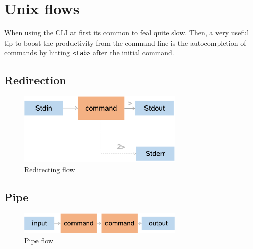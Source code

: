 \documentclass[
  letterpaper,
  DIV=11,
  numbers=noendperiod,
  oneside]{scrreprt}
\begin{document}
\hypertarget{unix-flows}{%
\section{Unix flows}\label{unix-flows}}

\begin{tcolorbox}[enhanced jigsaw, opacityback=0, leftrule=.75mm, breakable, titlerule=0mm, toprule=.15mm, rightrule=.15mm, title=\textcolor{quarto-callout-tip-color}{\faLightbulb}\hspace{0.5em}{Tip}, colback=white, opacitybacktitle=0.6, toptitle=1mm, bottomtitle=1mm, colframe=quarto-callout-tip-color-frame, colbacktitle=quarto-callout-tip-color!10!white, arc=.35mm, coltitle=black, bottomrule=.15mm, left=2mm]
When using the CLI at first its common to feal quite slow. Then, a very
useful tip to boost the productivity from the command line is the
autocompletion of commands by hitting
\texttt{\textless{}tab\textgreater{}} after the initial command.
\end{tcolorbox}

\hypertarget{redirection}{%
\subsection{Redirection}\label{redirection}}

\begin{figure}

{\centering \includegraphics[width=0.7\textwidth,height=\textheight]{chs-command-line/imgs-cli/redirection.png}

}

\caption{Redirecting flow}

\end{figure}

\hypertarget{pipe}{%
\subsection{Pipe}\label{pipe}}

\begin{figure}

{\centering \includegraphics[width=0.7\textwidth,height=\textheight]{chs-command-line/imgs-cli/pipeflow.png}

}

\caption{Pipe flow}

\end{figure}
\end{document}
